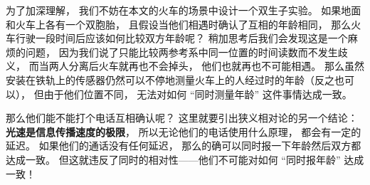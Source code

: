 为了加深理解， 我们不妨在本文的火车的场景中设计一个双生子实验。 如果地面和火车上各有一个双胞胎， 且假设当他们相遇时确认了互相的年龄相同， 那么火车行驶一段时间后应该如何比较双方年龄呢？ 稍加思考后我们会发现这是一个麻烦的问题， 因为我们说了只能比较两参考系中同一位置的时间读数而不发生歧义， 而当两人分离后火车就再也不会掉头， 他们也就再也不可能相遇。 那么虽然安装在铁轨上的传感器仍然可以不停地测量火车上的人经过时的年龄（反之也可以）， 但由于他们位置不同， 无法对如何 “同时测量年龄” 这件事情达成一致。

那么他们能不能打个电话互相确认呢？ 这里就要引出狭义相对论的另一个结论： \textbf{光速是信息传播速度的极限}， 所以无论他们的电话使用什么原理， 都会有一定的延迟。 如果他们的通话没有任何延迟， 那么的确可以同时报一下年龄然后双方都达成一致。 但这就违反了同时的相对性——他们不可能对如何 “同时报年龄” 达成一致！








